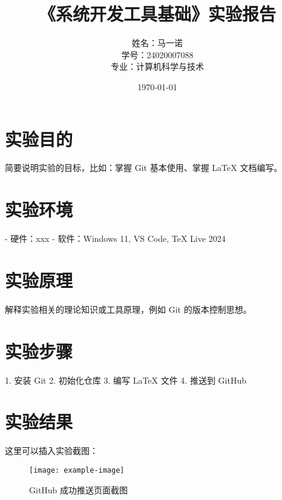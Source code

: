 \documentclass[UTF8]{ctexart}
\title{《系统开发工具基础》实验报告\\ }  %
\author{姓名：马一诺 \\ 学号：24020007088 \\ 专业：计算机科学与技术}
\date{\today}
\begin{document}

\maketitle 

\tableofcontents 
\newpage

\section{实验目的}
简要说明实验的目标，比如：掌握 Git 基本使用、掌握 LaTeX 文档编写。

\section{实验环境}
- 硬件：xxx  
- 软件：Windows 11, VS Code, TeX Live 2024  

\section{实验原理}
解释实验相关的理论知识或工具原理，例如 Git 的版本控制思想。

\section{实验步骤}
1. 安装 Git  
2. 初始化仓库  
3. 编写 LaTeX 文件  
4. 推送到 GitHub  

\section{实验结果}
这里可以插入实验截图：  
\begin{figure}[h]
  \centering
  \texttt{[image: example-image]}
  \caption{GitHub 成功推送页面截图}
\end{figure}
\end{document}
